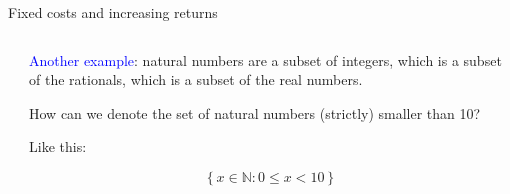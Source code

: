 \documentclass[notes,11pt, aspectratio=169, xcolor=table]{beamer}
\newcommand{\blue}[1]{\textcolor{blue}{#1}}
\newcommand{\blue}[1]{\textcolor{blue}{#1}}
\newenvironment{wideitemize}{\itemize\addtolength{\itemsep}{10pt}}{\enditemize}
\begin{document}
\begin{frame}{Fixed costs and increasing returns}
\normalsize

\begin{columns}[T] %
\begin{column}{.45\textwidth}
            \centering
{}
    

                
    \end{column}
    \begin{column}{.45\textwidth}

    \begin{wideitemize}
        \item \blue{Another example}: natural numbers are a subset of integers, which is a subset of the rationals, which is a subset of the real numbers.
        \item<2-> How can we denote the set of natural numbers (strictly) smaller than 10?

        \item<3-> Like this:

        \begin{equation*}
            \left\{ x \in \mathbb{N} : 0 \le x < 10 \right\}
        \end{equation*}
    \end{wideitemize}



\end{column}
\end{columns}


\end{frame}
\end{document}
